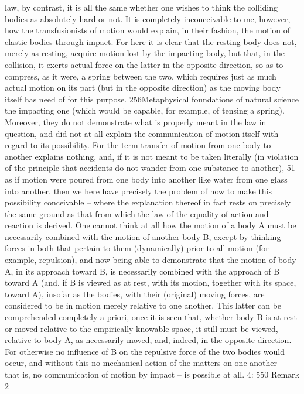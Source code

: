 law, by contrast, it is all the same whether one wishes to think the colliding
bodies as absolutely hard or not. It is completely inconceivable to me, however,
how the transfusionists of motion would explain, in their fashion, the motion
of elastic bodies through impact. For here it is clear that the resting body does
not, merely as resting, acquire motion lost by the impacting body, but that, in
the collision, it exerts actual force on the latter in the opposite direction, so as
to compress, as it were, a spring between the two, which requires just as much
actual motion on its part (but in the opposite direction) as the moving body
itself has need of for this purpose.
256Metaphysical foundations of natural science
the impacting one (which would be capable, for example, of tensing
a spring). Moreover, they do not demonstrate what is properly meant
in the law in question, and did not at all explain the communication of
motion itself with regard to its possibility. For the term transfer of motion
from one body to another explains nothing, and, if it is not meant to be
taken literally (in violation of the principle that accidents do not wander
from one substance to another), 51 as if motion were poured from one
body into another like water from one glass into another, then we here
have precisely the problem of how to make this possibility conceivable –
where the explanation thereof in fact rests on precisely the same ground
as that from which the law of the equality of action and reaction is
derived. One cannot think at all how the motion of a body A must be
necessarily combined with the motion of another body B, except by
thinking forces in both that pertain to them (dynamically) prior to all
motion (for example, repulsion), and now being able to demonstrate that
the motion of body A, in its approach toward B, is necessarily combined
with the approach of B toward A (and, if B is viewed as at rest, with its
motion, together with its space, toward A), insofar as the bodies, with their
(original) moving forces, are considered to be in motion merely relative
to one another. This latter can be comprehended completely a priori,
once it is seen that, whether body B is at rest or moved relative to the
empirically knowable space, it still must be viewed, relative to body A, as
necessarily moved, and, indeed, in the opposite direction. For otherwise
no inﬂuence of B on the repulsive force of the two bodies would occur,
and without this no mechanical action of the matters on one another –
that is, no communication of motion by impact – is possible at all.
4: 550
Remark 2
